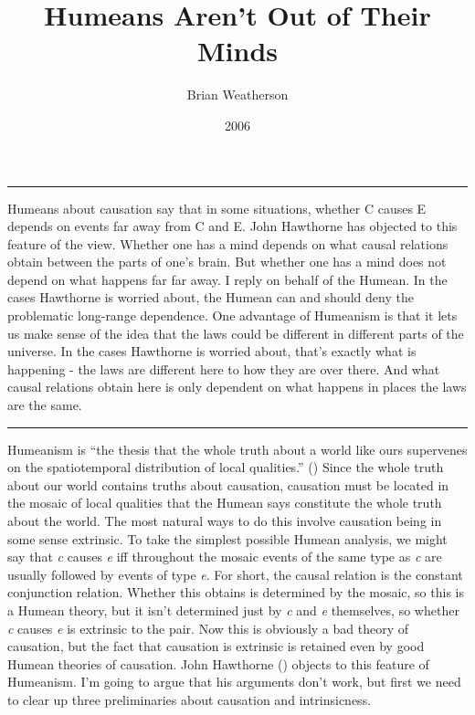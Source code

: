 \documentclass[
  10pt,
  letterpaper,
  DIV=11,
  numbers=noendperiod,
  twoside]{scrartcl}
\title{Humeans Aren't Out of Their Minds}
\author{Brian Weatherson}
\date{2006}
\renewenvironment{abstract}
 {\vspace{-1.25cm}
 \quotation\small\noindent\rule{\linewidth}{.5pt}\par\smallskip
 \noindent }
 {\par\noindent\rule{\linewidth}{.5pt}\endquotation}
\begin{document}
\maketitle
\begin{abstract}
Humeans about causation say that in some situations, whether C causes E
depends on events far away from C and E. John Hawthorne has objected to
this feature of the view. Whether one has a mind depends on what causal
relations obtain between the parts of one's brain. But whether one has a
mind does not depend on what happens far far away. I reply on behalf of
the Humean. In the cases Hawthorne is worried about, the Humean can and
should deny the problematic long-range dependence. One advantage of
Humeanism is that it lets us make sense of the idea that the laws could
be different in different parts of the universe. In the cases Hawthorne
is worried about, that's exactly what is happening - the laws are
different here to how they are over there. And what causal relations
obtain here is only dependent on what happens in places the laws are the
same.
\end{abstract}

Humeanism is ``the thesis that the whole truth about a world like ours
supervenes on the spatiotemporal distribution of local qualities.''
() Since the whole truth about
our world contains truths about causation, causation must be located in
the mosaic of local qualities that the Humean says constitute the whole
truth about the world. The most natural ways to do this involve
causation being in some sense extrinsic. To take the simplest possible
Humean analysis, we might say that \emph{c} causes \emph{e} iff
throughout the mosaic events of the same type as \emph{c} are usually
followed by events of type \emph{e}. For short, the causal relation is
the constant conjunction relation. Whether this obtains is determined by
the mosaic, so this is a Humean theory, but it isn't determined just by
\emph{c} and \emph{e} themselves, so whether \emph{c} causes \emph{e} is
extrinsic to the pair. Now this is obviously a bad theory of causation,
but the fact that causation is extrinsic is retained even by good Humean
theories of causation. John Hawthorne
() objects to this feature of
Humeanism. I'm going to argue that his arguments don't work, but first
we need to clear up three preliminaries about causation and
intrinsicness.
\end{document}
